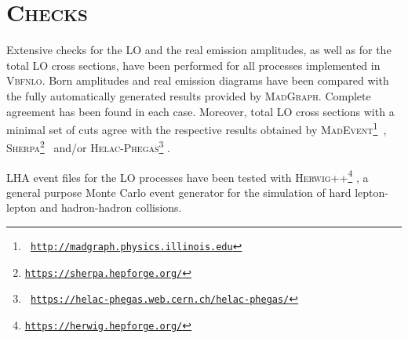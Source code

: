 \documentclass[english,12pt]{article}
\begin{document}
\newpage

\section{\textsc{Checks}}

Extensive checks for the LO and the real emission amplitudes, as well as for the
total LO cross sections, have been performed for all processes implemented in
\textsc{Vbfnlo}.  Born amplitudes and real emission diagrams have been compared
with the fully automatically generated results provided by
\textsc{MadGraph}\cite{Stelzer:1994ta}. Complete agreement has been found in
each case.  Moreover, total LO cross sections with a minimal set of cuts agree
with the respective results obtained by \textsc{MadEvent}\footnote{\tt
  \url{http://madgraph.physics.illinois.edu}}~\cite{Maltoni:2002qb,Alwall:2007st},
\textsc{Sherpa}\footnote{\tt \url{https://sherpa.hepforge.org/}}~\cite{Gleisberg:2008ta}
and/or \textsc{Helac-Phegas}\footnote{\tt
\url{https://helac-phegas.web.cern.ch/helac-phegas/}}
\cite{Kanaki:2000ey,Papadopoulos:2005ky,Cafarella:2007pc}. 

LHA event files for the LO processes have been tested with
\textsc{Herwig++}\footnote{\tt \url{https://herwig.hepforge.org/}}
\cite{Bahr:2008pv},  a general purpose Monte Carlo event generator for the
simulation of hard lepton-lepton and hadron-hadron collisions.
\end{document}
